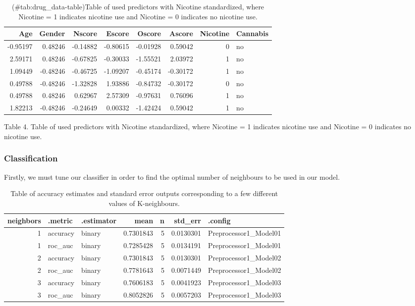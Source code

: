 \documentclass[
]{article}
\begin{document}
\begin{table}

\caption{(\#tab:drug_data-table)Table of used predictors with Nicotine standardized, where Nicotine = 1 indicates nicotine use and Nicotine = 0 indicates no nicotine use.}
\centering
\begin{tabular}[t]{r|r|r|r|r|r|r|l}
\hline
Age & Gender & Nscore & Escore & Oscore & Ascore & Nicotine & Cannabis\\
\hline
-0.95197 & 0.48246 & -0.14882 & -0.80615 & -0.01928 & 0.59042 & 0 & no\\
\hline
2.59171 & 0.48246 & -0.67825 & -0.30033 & -1.55521 & 2.03972 & 1 & no\\
\hline
1.09449 & -0.48246 & -0.46725 & -1.09207 & -0.45174 & -0.30172 & 1 & no\\
\hline
0.49788 & -0.48246 & -1.32828 & 1.93886 & -0.84732 & -0.30172 & 0 & no\\
\hline
0.49788 & 0.48246 & 0.62967 & 2.57309 & -0.97631 & 0.76096 & 1 & no\\
\hline
1.82213 & -0.48246 & -0.24649 & 0.00332 & -1.42424 & 0.59042 & 1 & no\\
\hline
\end{tabular}
\end{table}

Table 4. Table of used predictors with Nicotine standardized, where
Nicotine = 1 indicates nicotine use and Nicotine = 0 indicates no
nicotine use.

\hypertarget{classification}{%
\subsubsection{Classification}\label{classification}}

Firstly, we must tune our classifier in order to find the optimal number of neighbours to be used in our model.

\begin{table}

\caption{\label{tab:drugs-workflow-table}Table of accuracy estimates and standard error outputs corresponding to a few different values of K-neighbours.}
\centering
\begin{tabular}[t]{r|l|l|r|r|r|l}
\hline
neighbors & .metric & .estimator & mean & n & std\_err & .config\\
\hline
1 & accuracy & binary & 0.7301843 & 5 & 0.0130301 & Preprocessor1\_Model01\\
\hline
1 & roc\_auc & binary & 0.7285428 & 5 & 0.0134191 & Preprocessor1\_Model01\\
\hline
2 & accuracy & binary & 0.7301843 & 5 & 0.0130301 & Preprocessor1\_Model02\\
\hline
2 & roc\_auc & binary & 0.7781643 & 5 & 0.0071449 & Preprocessor1\_Model02\\
\hline
3 & accuracy & binary & 0.7606183 & 5 & 0.0041923 & Preprocessor1\_Model03\\
\hline
3 & roc\_auc & binary & 0.8052826 & 5 & 0.0057203 & Preprocessor1\_Model03\\
\hline
\end{tabular}
\end{table}
\end{document}

